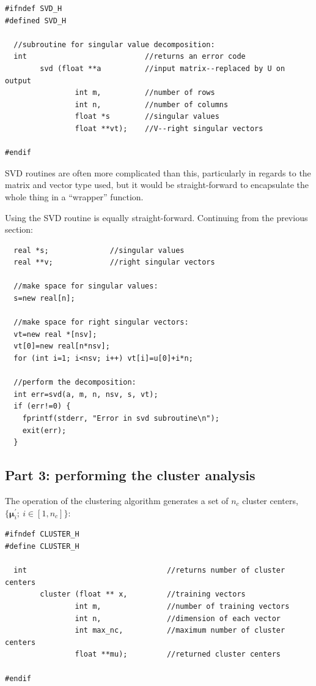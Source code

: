\documentclass{article}
\renewcommand{\vec}[1]{\boldsymbol{#1}}
\begin{document}
\begin{verbatim}
#ifndef SVD_H
#defined SVD_H

  //subroutine for singular value decomposition:
  int                           //returns an error code
        svd (float **a          //input matrix--replaced by U on output
                int m,          //number of rows
                int n,          //number of columns
                float *s        //singular values
                float **vt);    //V--right singular vectors

#endif
\end{verbatim}

SVD routines are often more complicated than this, particularly in regards
to the matrix and vector type used, but it would be 
straight-forward to encapsulate the whole thing in a ``wrapper'' function.

Using the SVD routine is equally straight-forward.
Continuing from the previous section:

\begin{verbatim}
  real *s;              //singular values
  real **v;             //right singular vectors

  //make space for singular values:
  s=new real[n];

  //make space for right singular vectors:
  vt=new real *[nsv];
  vt[0]=new real[n*nsv];
  for (int i=1; i<nsv; i++) vt[i]=u[0]+i*n;

  //perform the decomposition:
  int err=svd(a, m, n, nsv, s, vt);
  if (err!=0) {
    fprintf(stderr, "Error in svd subroutine\n");
    exit(err);
  }
\end{verbatim}

\subsection{Part 3: performing the cluster analysis}

The operation of the clustering algorithm generates a set of $n_c$ cluster
centers, $\lbrace \vec \mu^\prime_i; ~i \in [1, n_c] \rbrace$:

\begin{verbatim}
#ifndef CLUSTER_H
#define CLUSTER_H

  int                                //returns number of cluster centers
        cluster (float ** x,         //training vectors
                int m,               //number of training vectors
                int n,               //dimension of each vector
                int max_nc,          //maximum number of cluster centers
                float **mu);         //returned cluster centers

#endif
\end{verbatim}
\end{document}
